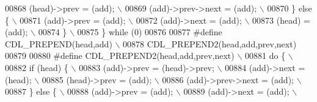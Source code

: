 \begin{DoxyCode}
00868 \textcolor{preprocessor}{   (head)->prev = (add);                                                                       \(\backslash\)}
00869 \textcolor{preprocessor}{   (add)->prev->next = (add);                                                                  \(\backslash\)}
00870 \textcolor{preprocessor}{ \} else \{                                                                                      \(\backslash\)}
00871 \textcolor{preprocessor}{   (add)->prev = (add);                                                                        \(\backslash\)}
00872 \textcolor{preprocessor}{   (add)->next = (add);                                                                        \(\backslash\)}
00873 \textcolor{preprocessor}{   (head) = (add);                                                                             \(\backslash\)}
00874 \textcolor{preprocessor}{ \}                                                                                             \(\backslash\)}
00875 \textcolor{preprocessor}{\} while (0)}
00876 
00877 \textcolor{preprocessor}{#define CDL\_PREPEND(head,add)                                                                  \(\backslash\)}
00878 \textcolor{preprocessor}{    CDL\_PREPEND2(head,add,prev,next)}
00879 
00880 \textcolor{preprocessor}{#define CDL\_PREPEND2(head,add,prev,next)                                                       \(\backslash\)}
00881 \textcolor{preprocessor}{do \{                                                                                           \(\backslash\)}
00882 \textcolor{preprocessor}{ if (head) \{                                                                                   \(\backslash\)}
00883 \textcolor{preprocessor}{   (add)->prev = (head)->prev;                                                                 \(\backslash\)}
00884 \textcolor{preprocessor}{   (add)->next = (head);                                                                       \(\backslash\)}
00885 \textcolor{preprocessor}{   (head)->prev = (add);                                                                       \(\backslash\)}
00886 \textcolor{preprocessor}{   (add)->prev->next = (add);                                                                  \(\backslash\)}
00887 \textcolor{preprocessor}{ \} else \{                                                                                      \(\backslash\)}
00888 \textcolor{preprocessor}{   (add)->prev = (add);                                                                        \(\backslash\)}
00889 \textcolor{preprocessor}{   (add)->next = (add);                                                                        \(\backslash\)}

\end{DoxyCode}
